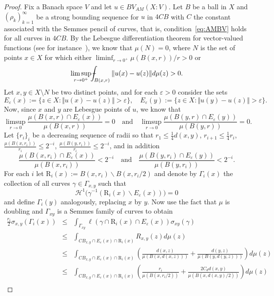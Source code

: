 \documentclass[11pt, letterpaper]{amsart} %
\providecommand*{\vint}[1]{\mathchoice
          {\mathop{\vrule width 5pt height 3 pt depth -2.5pt
                  \kern -9pt \kern 1pt\intop}\nolimits_{\kern -5pt{#1}}}
          {\mathop{\vrule width 5pt height 3 pt depth -2.6pt
                  \kern -6pt \intop}\nolimits_{\kern -3pt{#1}}}
          {\mathop{\vrule width 5pt height 3 pt depth -2.6pt
                  \kern -6pt \intop}\nolimits_{\kern -3pt{#1}}}
          {\mathop{\vrule width 5pt height 3 pt depth -2.6pt
                  \kern -6pt \intop}\nolimits_{\kern -3pt{#1}}}}
\numberwithin{equation}{section}
\theoremstyle{plain}
\theoremstyle{definition}
\begin{document}
{\begin{proof}
Fix a Banach space $V$ and let $u\in BV_{AM}(X:V)$.  Let $B$ be a ball in $X$ and
$(\rho_k)_{k=1}^\infty$ be a strong bounding sequence 
for $u$ in $4C B$ with $C$ the constant associated with the Semmes pencil of curves, that is,
condition~\eqref{eq:AMBV} holds for all curves in $4C B$. By the Lebesgue differentiation theorem 
for vector-valued functions (see for instance~\cite[page~77]{HKSTbook}),
we know that 
$\mu (N)=0$, where $N$ is the set of points $x\in X$ for which either $\liminf_{r\to 0^+}\mu(B(x,r))/r>0$ or
\[
\limsup_{r\to 0^+}\vint{B(x,r)}\Vert u(x)-u(z)\Vert d\mu (z)>0.
\]
Let $x,y\in X\setminus N$ be two distinct points, and for each $\varepsilon >0$ consider the sets
\[
E_\varepsilon (x):=\{ z\in X:\Vert u(x)-u(z)\Vert >\varepsilon \},\quad E_\varepsilon (y):=\{ z\in X:\Vert u(y)-u(z)\Vert >\varepsilon \}.
\]
Now, since $x$ and $y$ are Lebesgue points of $u$, we know that
\[
\limsup_{r\to 0}\frac{\mu (B(x,r)\cap E_\varepsilon (x))}{\mu (B(x,r))}=0
\quad\text{and}\quad \limsup_{r\to 0}\frac{\mu (B(y,r)\cap E_\varepsilon (y))}{\mu (B(y,r))}=0.
\]
Let $\{ r_i\}_i$ be a decreasing sequence of radii so that $r_1\leq \frac{1}{4}d(x,y)$, $r_{i+1}\leq \frac{1}{4}r_i$, 
$\frac{\mu (B(x,r_i))}{r_i}\leq 2^{-i}$, $\frac{\mu (B(y,r_i))}{r_i}\leq 2^{-i}$, and in addition
\[
\frac{\mu (B(x,r_i)\cap E_\varepsilon (x))}{\mu (B(x,r_i))}<2^{-i}
\quad\text{and}\quad \frac{\mu (B(y,r_i)\cap E_\varepsilon (y))}{\mu (B(y,r_i))}<2^{-i}.
\]
For each $i$ let $\mathrm{R}_i(x):=B(x,r_i)\backslash B(x,r_i/2)$ and denote by $\Gamma_i (x)$ the collection 
of all curves $\gamma\in\Gamma_{x,y}$ such that
$$\mathcal{H}^1\big( \gamma^{-1}(\mathrm{R}_i(x)\backslash E_\varepsilon (x))\big) =0$$
and define $\Gamma_i (y)$ analogously, replacing $x$ by $y$. 
Now use the fact that $\mu$ is doubling and $\Gamma_{xy}$ 
is a Semmes family of curves to obtain
\begin{eqnarray*}
\frac{r_i}{2}\sigma_{x,y}(\Gamma _i(x))&\le&\int_{\Gamma_{xy}}\ell (\gamma\cap\mathrm{R}_i(x)\cap E_\varepsilon (x))\sigma_{xy}(\gamma )\\
&\le & \int_{CB_{x,y}\cap E_\varepsilon (x)\cap\mathrm{R}_i(x)}R_{x,y}(z)d\mu (z) \\
&\leq & \int_{CB_{x,y}\cap E_\varepsilon (x)\cap \mathrm{R}_i(x)}\left(\frac{d(x,z)}{\mu (B(x,d(x,z)))}+\frac{d(y,z)}{\mu (B(y,d(y,z)))}\right)d\mu (z)\\
&\leq &\int_{CB_{x,y}\cap E_\varepsilon (x)\cap \mathrm{R}_i(x)}\left(\frac{r_i}{\mu (B(x,r_i/2))}+\frac{2C_dd(x,y)}{\mu (B(x,d(x,y)/2))}\right)d\mu (z)\\

\end{eqnarray*}
\end{proof}}
\end{document}
